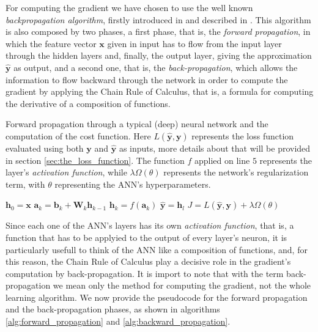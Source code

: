 		For computing the gradient we have chosen to use
		the well known \textit{backpropagation algorithm}, firstly introduced in \cite{10028086174} and described
		in \cite{Goodfellow-et-al-2016,haykin2009neural,mitchell1997machine}. This algorithm is
		also composed by two phases, a first phase, that is, the \textit{forward propagation}, in which the
		feature vector $\mathbf{x}$ given in input has to flow from the input layer through the hidden layers and,
		finally, the output layer, giving the approximation $\hat{\mathbf{y}}$ as output, and a second one, that
		is, the \textit{back-propagation}, which allows the information to flow backward through the network in
		order to compute the gradient by applying the Chain Rule of Calculus, that is, a formula for computing the
		derivative of a composition of functions.

		\begin{algorithm}[H]
			\caption{Forward propagation through a typical (deep) neural network and the computation of the cost
			function. Here $L(\hat{\mathbf{y}}, \mathbf{y})$ represents the loss function evaluated using both
			$\mathbf{y}$ and $\hat{\mathbf{y}}$ as inputs, more details about that will be provided in
			section \ref{sec:the_loss_function}. The function $f$ applied on line $5$ represents
			the layer's \textit{activation function}, while $\lambda \Omega(\theta)$ represents the
			network's regularization term, with $\theta$ representing the ANN's hyperparameters.}
			\label{alg:forward_propagation}
			\begin{algorithmic}[1]
					\State $\mathbf{h}_{0} = \mathbf{x}$
						\State $\mathbf{a}_{k} = \mathbf{b}_{k} + \mathbf{W}_{k}\mathbf{h}_{k - 1}$
						\State $\mathbf{h}_{k} = f(\mathbf{a}_{k})$
					\EndFor
					\State $\hat{\mathbf{y}} = \mathbf{h}_{l}$
					\State $J = L(\hat{\mathbf{y}}, \mathbf{y}) + \lambda \Omega(\theta)$
				\EndProcedure
			\end{algorithmic}
		\end{algorithm}

		Since each one of the ANN's layers has its own
		\textit{activation function}, that is, a function that has to be applyied to the output of every layer's
		neuron, it is particularly usefull to think of the ANN like a composition of functions, and, for this
		reason, the Chain Rule of Calculus play a decisive role in the gradient's computation by back-propagation.
		It is import to note that with the term back-propagation we mean
		only the method for computing the gradient, not the whole learning algorithm. We now provide the
		pseudocode for the forward propagation and the back-propagation phases, as shown in algorithms
		\ref{alg:forward_propagation} and \ref{alg:backward_propagation}.

